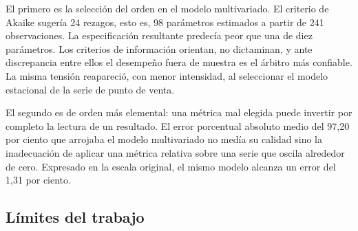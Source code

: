 El primero es la selección del orden en el modelo multivariado. El criterio de Akaike sugería
24 rezagos, esto es, 98 parámetros estimados a partir de 241 observaciones. La especificación
resultante predecía peor que una de diez parámetros. Los criterios de información orientan, no dictaminan, y ante discrepancia entre ellos el desempeño fuera de muestra es el árbitro más confiable. La misma tensión reapareció, con menor intensidad, al
seleccionar el modelo estacional de la serie de punto de venta.

El segundo es de orden más elemental: una métrica mal elegida puede invertir por completo la
lectura de un resultado. El error porcentual absoluto medio del 97,20 por ciento que arrojaba
el modelo multivariado no medía su calidad sino la inadecuación de aplicar una métrica relativa
sobre una serie que oscila alrededor de cero. Expresado en la escala original, el mismo modelo
alcanza un error del 1,31 por ciento.

\subsection{Límites del trabajo}

